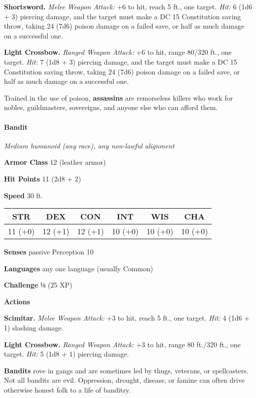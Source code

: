 \documentclass[
]{article}
\begin{document}
\textbf{Shortsword.} \emph{Melee Weapon Attack:} +6 to hit, reach 5 ft.,
one target. \emph{Hit:} 6 (1d6 + 3) piercing damage, and the target must
make a DC 15 Constitution saving throw, taking 24 (7d6) poison damage on
a failed save, or half as much damage on a successful one.

\textbf{Light Crossbow.} \emph{Ranged Weapon Attack:} +6 to hit, range
80/320 ft., one target. \emph{Hit:} 7 (1d8 + 3) piercing damage, and the
target must make a DC 15 Constitution saving throw, taking 24 (7d6)
poison damage on a failed save, or half as much damage on a successful
one.

Trained in the use of poison, \textbf{assassins} are remorseless killers
who work for nobles, guildmasters, sovereigns, and anyone else who can
afford them.

\hypertarget{bandit}{%
\paragraph{Bandit}\label{bandit}}

\emph{Medium humanoid (any race), any non-lawful alignment}

\textbf{Armor Class} 12 (leather armor)

\textbf{Hit Points} 11 (2d8 + 2)

\textbf{Speed} 30 ft.

\begin{longtable}[]{@{}cccccc@{}}
\toprule
STR & DEX & CON & INT & WIS & CHA\tabularnewline
\midrule
\endhead
11 (+0) & 12 (+1) & 12 (+1) & 10 (+0) & 10 (+0) & 10 (+0)\tabularnewline
\bottomrule
\end{longtable}

\textbf{Senses} passive Perception 10

\textbf{Languages} any one language (usually Common)

\textbf{Challenge} ⅛ (25 XP)

\textbf{Actions}

\textbf{Scimitar.} \emph{Melee Weapon Attack:} +3 to hit, reach 5 ft.,
one target. \emph{Hit:} 4 (1d6 + 1) slashing damage.

\textbf{Light Crossbow.} \emph{Ranged Weapon Attack:} +3 to hit, range
80 ft./320 ft., one target. \emph{Hit:} 5 (1d8 + 1) piercing damage.

\textbf{Bandits} rove in gangs and are sometimes led by thugs, veterans,
or spellcasters. Not all bandits are evil. Oppression, drought, disease,
or famine can often drive otherwise honest folk to a life of banditry.
\end{document}
